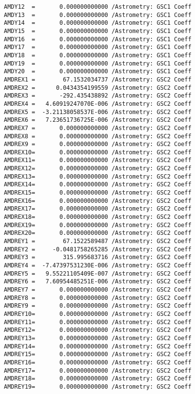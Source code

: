 \documentclass[11pt]{article}
\begin{document}
\begin{tcolorbox}[breakable, size=fbox, boxrule=.5pt, pad at break*=1mm, opacityfill=0]
\begin{Verbatim}[commandchars=\\\{\}]
AMDY12  =       0.000000000000 /Astrometry: GSC1 Coeff
AMDY13  =       0.000000000000 /Astrometry: GSC1 Coeff
AMDY14  =       0.000000000000 /Astrometry: GSC1 Coeff
AMDY15  =       0.000000000000 /Astrometry: GSC1 Coeff
AMDY16  =       0.000000000000 /Astrometry: GSC1 Coeff
AMDY17  =       0.000000000000 /Astrometry: GSC1 Coeff
AMDY18  =       0.000000000000 /Astrometry: GSC1 Coeff
AMDY19  =       0.000000000000 /Astrometry: GSC1 Coeff
AMDY20  =       0.000000000000 /Astrometry: GSC1 Coeff
AMDREX1 =        67.1532034737 /Astrometry: GSC2 Coeff
AMDREX2 =      0.0434354199559 /Astrometry: GSC2 Coeff
AMDREX3 =       -292.435438892 /Astrometry: GSC2 Coeff
AMDREX4 =   4.60919247070E-006 /Astrometry: GSC2 Coeff
AMDREX5 =  -3.21138058537E-006 /Astrometry: GSC2 Coeff
AMDREX6 =   7.23651736725E-006 /Astrometry: GSC2 Coeff
AMDREX7 =       0.000000000000 /Astrometry: GSC2 Coeff
AMDREX8 =       0.000000000000 /Astrometry: GSC2 Coeff
AMDREX9 =       0.000000000000 /Astrometry: GSC2 Coeff
AMDREX10=       0.000000000000 /Astrometry: GSC2 Coeff
AMDREX11=       0.000000000000 /Astrometry: GSC2 Coeff
AMDREX12=       0.000000000000 /Astrometry: GSC2 Coeff
AMDREX13=       0.000000000000 /Astrometry: GSC2 Coeff
AMDREX14=       0.000000000000 /Astrometry: GSC2 Coeff
AMDREX15=       0.000000000000 /Astrometry: GSC2 Coeff
AMDREX16=       0.000000000000 /Astrometry: GSC2 Coeff
AMDREX17=       0.000000000000 /Astrometry: GSC2 Coeff
AMDREX18=       0.000000000000 /Astrometry: GSC2 Coeff
AMDREX19=       0.000000000000 /Astrometry: GSC2 Coeff
AMDREX20=       0.000000000000 /Astrometry: GSC2 Coeff
AMDREY1 =        67.1522589487 /Astrometry: GSC2 Coeff
AMDREY2 =     -0.0481758265285 /Astrometry: GSC2 Coeff
AMDREY3 =        315.995683716 /Astrometry: GSC2 Coeff
AMDREY4 =  -7.47397531230E-006 /Astrometry: GSC2 Coeff
AMDREY5 =   9.55221105409E-007 /Astrometry: GSC2 Coeff
AMDREY6 =   7.60954485251E-006 /Astrometry: GSC2 Coeff
AMDREY7 =       0.000000000000 /Astrometry: GSC2 Coeff
AMDREY8 =       0.000000000000 /Astrometry: GSC2 Coeff
AMDREY9 =       0.000000000000 /Astrometry: GSC2 Coeff
AMDREY10=       0.000000000000 /Astrometry: GSC2 Coeff
AMDREY11=       0.000000000000 /Astrometry: GSC2 Coeff
AMDREY12=       0.000000000000 /Astrometry: GSC2 Coeff
AMDREY13=       0.000000000000 /Astrometry: GSC2 Coeff
AMDREY14=       0.000000000000 /Astrometry: GSC2 Coeff
AMDREY15=       0.000000000000 /Astrometry: GSC2 Coeff
AMDREY16=       0.000000000000 /Astrometry: GSC2 Coeff
AMDREY17=       0.000000000000 /Astrometry: GSC2 Coeff
AMDREY18=       0.000000000000 /Astrometry: GSC2 Coeff
AMDREY19=       0.000000000000 /Astrometry: GSC2 Coeff

\end{Verbatim}
\end{tcolorbox}
\end{document}
